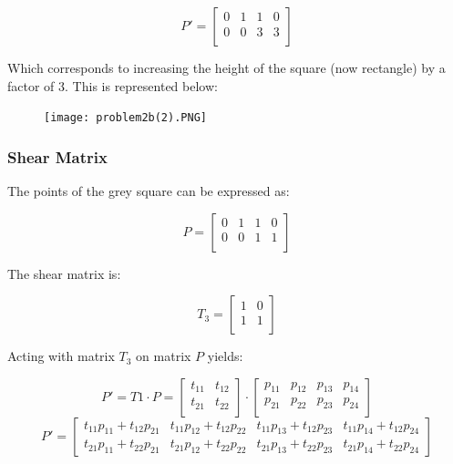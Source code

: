 \documentclass{article}
\begin{document}
\[P' = 
\begin{bmatrix}
    0 & 1 & 1 & 0 \\
    0 & 0 & 3 & 3 \\
\end{bmatrix}
\]

Which corresponds to increasing the height of the square (now rectangle) by a factor of 3. This is represented below:

\begin{figure}[H]
  \centering
  \texttt{[image: problem2b(2).PNG]}
  \label{fig3}
\end{figure}

\subsubsection*{Shear Matrix}

The points of the grey square can be expressed as:

\[P = 
\begin{bmatrix}
    0 & 1 & 1 & 0 \\
    0 & 0 & 1 & 1 \\
\end{bmatrix}
\]

The shear matrix is:

\[T_{3} = 
\begin{bmatrix}
    1 & 0  \\
    1 & 1  \\
\end{bmatrix}
\]

Acting with matrix $T_3$ on matrix $P$ yields:

\[ 
P' = T1 \cdot P = \begin{bmatrix}
t_{11} & t_{12} \\
t_{21} & t_{22} \\
\end{bmatrix} \cdot \begin{bmatrix}
p_{11} & p_{12} & p_{13} & p_{14} \\
p_{21} & p_{22} & p_{23} & p_{24} \\
\end{bmatrix}
\]
\[P' =  
\begin{bmatrix}
    t_{11}p_{11} + t_{12}p_{21} & t_{11}p_{12} + t_{12}p_{22} & t_{11}p_{13} + t_{12}p_{23} & t_{11}p_{14} + t_{12}p_{24} \\
    t_{21}p_{11} + t_{22}p_{21} & t_{21}p_{12} + t_{22}p_{22} & t_{21}p_{13} + t_{22}p_{23} & t_{21}p_{14} + t_{22}p_{24}
\end{bmatrix}
\]
\end{document}

